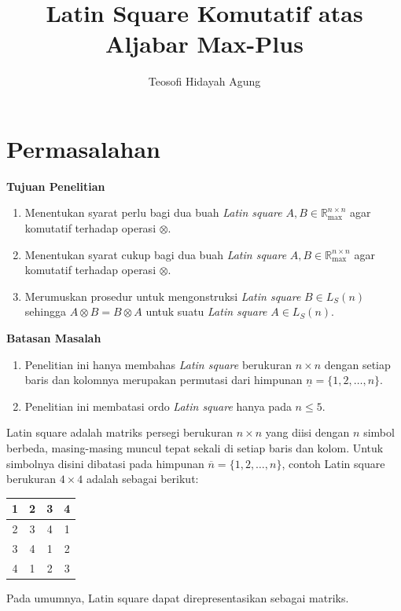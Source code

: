 \documentclass[aspectratio=169]{beamer}
\title[Proposal TA]{Latin Square Komutatif atas Aljabar Max-Plus}
\author[Teosofi]{Teosofi Hidayah Agung}
\institute[Matematika ITS]{Departemen Matematika\\ Institut Teknologi Sepuluh Nopember}
\theoremstyle{definition}
\numberwithin{definisi}{subsection}
\newcommand{\R}{\mathbb{R}}
\begin{document}
\begin{frame}
  \titlepage
\end{frame}


\section{Permasalahan}
\begin{frame}{\insertsection}
  \textbf{Tujuan Penelitian}
  \begin{enumerate}
    \item Menentukan syarat perlu bagi dua buah \textit{Latin square} $A,B\in\R^{n\times n}_{\max}$ agar komutatif terhadap operasi $\otimes$.
    \item Menentukan syarat cukup bagi dua buah \textit{Latin square} $A,B\in\R^{n\times n}_{\max}$ agar komutatif terhadap operasi $\otimes$.
    \item Merumuskan prosedur untuk mengonstruksi \textit{Latin square} $B \in L_S(n)$ sehingga $A \otimes B = B \otimes A$ untuk suatu \textit{Latin square} $A \in L_S(n)$.
  \end{enumerate}
  \textbf{Batasan Masalah}
  \begin{enumerate}
    \item Penelitian ini hanya membahas \textit{Latin square} berukuran $n\times n$ dengan setiap baris dan kolomnya merupakan permutasi dari himpunan $\underline{n}=\{1,2,\ldots,n\}$.
    \item Penelitian ini membatasi ordo \textit{Latin square} hanya pada $n \leq 5$.
  \end{enumerate}
\end{frame}

\begin{frame}{\insertsection}
  Latin square adalah matriks persegi berukuran $n \times n$ yang diisi dengan $n$ simbol berbeda, masing-masing muncul tepat sekali di setiap baris dan kolom. Untuk simbolnya disini dibatasi pada himpunan $\overline{n} = \{1, 2, \dots, n\}$, contoh Latin square berukuran $4 \times 4$ adalah sebagai berikut:
  \begin{center}
    \begin{tabular}{|c|c|c|c|}
      \hline
      1 & 2 & 3 & 4 \\
      \hline
      2 & 3 & 4 & 1 \\
      \hline
      3 & 4 & 1 & 2 \\
      \hline
      4 & 1 & 2 & 3 \\
      \hline
    \end{tabular}
  \end{center}
  Pada umumnya, Latin square dapat direpresentasikan sebagai matriks.
\end{frame}
\end{document}
